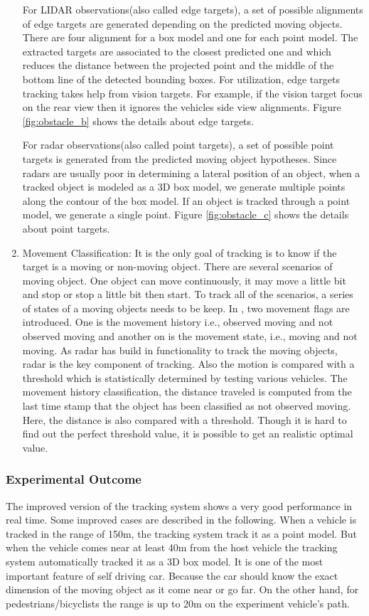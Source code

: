 \begin{enumerate}[label=\Alph*]
    For LIDAR observations(also called edge targets), a set of possible alignments of edge targets are generated depending on the predicted moving objects. There are four alignment for a box model and one for each point model\cite{Cho_2014}. The extracted targets are associated to the closest predicted one and which reduces the distance between the projected point and the middle of the bottom line of the detected bounding boxes. For utilization, edge targets tracking takes help from vision targets. For example, if the vision target focus on the rear view then it ignores the vehicles side view alignments. Figure \ref{fig:obstacle_b} shows the details about edge targets.
    
    For radar observations(also called point targets), a set of possible point targets is generated from the predicted moving object hypotheses\cite{Cho_2014}. Since radars are usually poor in determining a lateral position of an object, when a tracked object is modeled as a 3D box model, we generate multiple points along the contour of the box model. If an object is tracked through a point model, we generate a single point\cite{Cho_2014}. Figure \ref{fig:obstacle_c} shows the details about point targets.
    
    \item Movement Classification: It is the only goal of tracking is to know if the target is a moving or non-moving object. There are several scenarios of moving object. One object can move continuously, it may move a little bit and stop or stop a little bit then start. To track all of the scenarios, a series of states of a moving objects needs to be keep. In \cite{Cho_2014}, two movement flags are introduced. One is the movement history i.e., observed moving and not observed moving and another on is the movement state, i.e., moving and not moving\cite{Cho_2014}. As radar has build in functionality to track the moving objects, radar is the key component of tracking. Also the motion is compared with a threshold which is statistically determined by testing various vehicles. The movement history classification, the distance traveled is computed from the last time stamp that the object has been classified as not observed moving\cite{Cho_2014}. Here, the distance is also compared with a threshold. Though it is hard to find out the perfect threshold value, it is possible to get an realistic optimal value.
\end{enumerate}
\subsubsection{Experimental Outcome}
The improved version of the tracking system shows a very good performance in real time\cite{Cho_2014}. Some improved cases are described in the following. When a vehicle is tracked in the range of 150m, the tracking system track it as a point model. But when the vehicle comes near at least 40m from the host vehicle the tracking system automatically tracked it as a 3D box model. It is one of the most important feature of self driving car. Because the car should know the exact dimension of the moving object as it come near or go far\cite{Cho_2014}. On the other hand, for pedestrians/bicyclists the range is up to 20m on the experiment vehicle's path.
